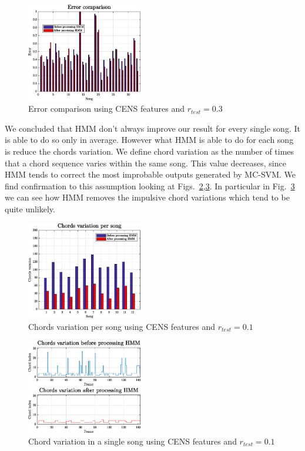 \begin{figure} [t]
	\centering
	\includegraphics[width=0.45\textwidth]{img/Result_HMM/CENS/plot03071}
	\caption{Error comparison using CENS features and $r_{test}=0.3$}
	\label{fig:compareerror}
\end{figure}

We concluded that HMM don't always improve our result for every single song. It is able to do so only in average. However what HMM is able to do for each song is reduce the chords variation. We define chord variation as the number of times that a chord sequence varies within the same song. This value decreases, since HMM tends to correct the most improbable outputs generated by MC-SVM. We find confirmation to this assumption looking at Figs.~\ref{fig:smoothmulti},\ref{fig:smoothsingle}. In particular in Fig.~\ref{fig:smoothsingle} we can see how HMM removes the impulsive chord variations which tend to be quite unlikely.

\begin{figure} [h!]
	\centering
	\includegraphics[width=0.45\textwidth]{img/Result_HMM/SMOOTHING/SmoothPerSongCENS0109}
	\caption{Chords variation per song using CENS features and $r_{test}=0.1$}
	\label{fig:smoothmulti}
\end{figure}

\begin{figure} [h!]
	\centering
	\includegraphics[width=0.45\textwidth]{img/Result_HMM/SMOOTHING/SmoothSingleSongCENS0109}
	\caption{Chord variation in a single song using CENS features and $r_{test}=0.1$}
	\label{fig:smoothsingle}
\end{figure}
